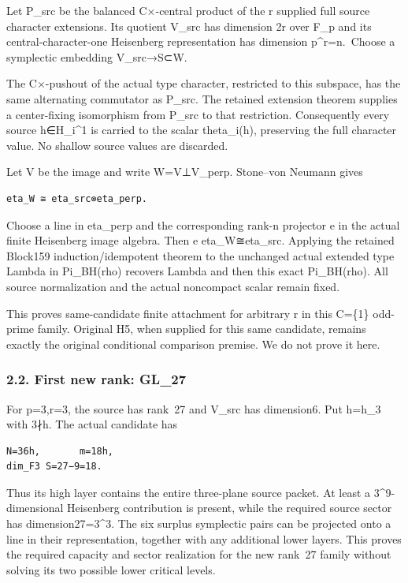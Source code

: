 Let P\_src be the balanced C×-central product of the r supplied full
source character extensions. Its quotient V\_src has dimension 2r over
F\_p and its central-character-one Heisenberg representation has
dimension p\^{}r=n.~Choose a symplectic embedding V\_src→S⊂W.

The C×-pushout of the actual type character, restricted to this
subspace, has the same alternating commutator as P\_src. The retained
extension theorem supplies a center-fixing isomorphism from P\_src to
that restriction. Consequently every source h∈H\_i\^{}1 is carried to
the scalar theta\_i(h), preserving the full character value. No shallow
source values are discarded.

Let V be the image and write W=V⊥V\_perp. Stone--von Neumann gives

\begin{Verbatim}[fontsize=\small,breaklines=true,breakanywhere=true]
eta_W ≅ eta_src⊗eta_perp.
\end{Verbatim}

Choose a line in eta\_perp and the corresponding rank-n projector e in
the actual finite Heisenberg image algebra. Then e eta\_W≅eta\_src.
Applying the retained Block159 induction/idempotent theorem to the
unchanged actual extended type Lambda in Pi\_BH(rho) recovers Lambda and
then this exact Pi\_BH(rho). All source normalization and the actual
noncompact scalar remain fixed.

This proves same-candidate finite attachment for arbitrary r in this
C=\{1\} odd-prime family. Original H5, when supplied for this same
candidate, remains exactly the original conditional comparison premise.
We do not prove it here.

\hypertarget{odd_capacity-first-new-rank-gl_27}{%
\subsubsection{2.2. First new rank: GL\_27}\label{odd_capacity-first-new-rank-gl_27}}

For p=3,r=3, the source has rank~27 and V\_src has dimension6. Put h=h\_3
with 3∤h. The actual candidate has

\begin{Verbatim}[fontsize=\small,breaklines=true,breakanywhere=true]
N=36h,       m=18h,
dim_F3 S=27−9=18.
\end{Verbatim}

Thus its high layer contains the entire three-plane source packet. At
least a 3\^{}9-dimensional Heisenberg contribution is present, while the
required source sector has dimension27=3\^{}3. The six surplus
symplectic pairs can be projected onto a line in their representation,
together with any additional lower layers. This proves the required
capacity and sector realization for the new rank~27 family without
solving its two possible lower critical levels.

